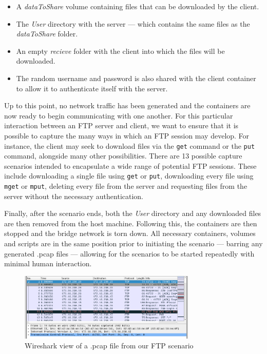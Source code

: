 \documentclass[sigconf,anonymous]{acmart}\usepackage[]{graphicx}\usepackage[]{color}
\begin{document}
\begin{itemize}
\item A \textit{dataToShare} volume containing files that can be downloaded by the client.
\item The \textit{User} directory with the server --- which contains the same files as the \textit{dataToShare} folder.
\item An empty \textit{recieve} folder with the client into which the files will be downloaded.
\item The random username and password is also shared with the client container to allow it to authenticate itself with the server.
\end{itemize}
    
    Up to this point, no network traffic has been generated and the containers are now ready to begin communicating with one another. 
    For this particular interaction between an FTP server and client, we want to ensure that it is possible to capture the many ways in which an FTP session may develop. For instance, the client may seek to download files via the \texttt{get} command or the \texttt{put} command, alongside many other possibilities. There are 13 possible capture scenarios intended to encapsulate a wide range of potential FTP sessions. These include downloading a single file using \texttt{get} or \texttt{put}, downloading every file using \texttt{mget} or \texttt{mput}, deleting every file from the server and requesting files from the server without the necessary authentication.

    Finally, after the scenario ends, both the \textit{User} directory and any downloaded files are then removed from the host machine. Following this, the containers are then stopped and the bridge network is torn down. All necessary containers, volumes and scripts are in the same position prior to initiating the scenario --- barring any generated .pcap files --- allowing for the scenarios to be started repeatedly with minimal human interaction.
    
    \begin{figure}[H]
\centering
\includegraphics[width=0.75\textwidth]{images/pcap.png}
\caption{Wireshark view of a .pcap file from our FTP scenario}
\end{figure}
    
\end{document}
